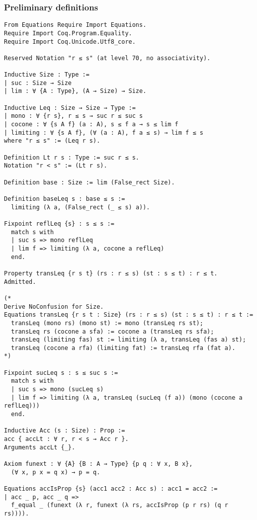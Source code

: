 \documentclass[acmsmall,review,anonymous]{acmart}\settopmatter{printfolios=true,printccs=false,printacmref=false}
\begin{document}
\subsubsection{Preliminary definitions} \label{app:mechanization:coq:prelim}

\begin{verbatim}
From Equations Require Import Equations.
Require Import Coq.Program.Equality.
Require Import Coq.Unicode.Utf8_core.

Reserved Notation "r ≤ s" (at level 70, no associativity).

Inductive Size : Type :=
| suc : Size → Size
| lim : ∀ {A : Type}, (A → Size) → Size.

Inductive Leq : Size → Size → Type :=
| mono : ∀ {r s}, r ≤ s → suc r ≤ suc s
| cocone : ∀ {s A f} (a : A), s ≤ f a → s ≤ lim f
| limiting : ∀ {s A f}, (∀ (a : A), f a ≤ s) → lim f ≤ s
where "r ≤ s" := (Leq r s).

Definition Lt r s : Type := suc r ≤ s.
Notation "r < s" := (Lt r s).

Definition base : Size := lim (False_rect Size).

Definition baseLeq s : base ≤ s :=
  limiting (λ a, (False_rect (_ ≤ s) a)).

Fixpoint reflLeq {s} : s ≤ s :=
  match s with
  | suc s => mono reflLeq
  | lim f => limiting (λ a, cocone a reflLeq)
  end.

Property transLeq {r s t} (rs : r ≤ s) (st : s ≤ t) : r ≤ t.
Admitted.

(*
Derive NoConfusion for Size.
Equations transLeq {r s t : Size} (rs : r ≤ s) (st : s ≤ t) : r ≤ t :=
  transLeq (mono rs) (mono st) := mono (transLeq rs st);
  transLeq rs (cocone a sfa) := cocone a (transLeq rs sfa);
  transLeq (limiting fas) st := limiting (λ a, transLeq (fas a) st);
  transLeq (cocone a rfa) (limiting fat) := transLeq rfa (fat a).
*)

Fixpoint sucLeq s : s ≤ suc s :=
  match s with
  | suc s => mono (sucLeq s)
  | lim f => limiting (λ a, transLeq (sucLeq (f a)) (mono (cocone a reflLeq)))
  end.

Inductive Acc (s : Size) : Prop :=
acc { accLt : ∀ r, r < s → Acc r }.
Arguments accLt {_}.

Axiom funext : ∀ {A} {B : A → Type} {p q : ∀ x, B x},
  (∀ x, p x = q x) → p = q.

Equations accIsProp {s} (acc1 acc2 : Acc s) : acc1 = acc2 :=
| acc _ p, acc _ q =>
  f_equal _ (funext (λ r, funext (λ rs, accIsProp (p r rs) (q r rs)))).


\end{verbatim}
\end{document}
